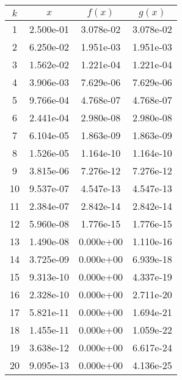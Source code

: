 \begin{tabular}{cccc}
\toprule
 $k$ &       $x$ &    $f(x)$ &    $g(x)$ \\
\midrule
   1 & 2.500e-01 & 3.078e-02 & 3.078e-02 \\
   2 & 6.250e-02 & 1.951e-03 & 1.951e-03 \\
   3 & 1.562e-02 & 1.221e-04 & 1.221e-04 \\
   4 & 3.906e-03 & 7.629e-06 & 7.629e-06 \\
   5 & 9.766e-04 & 4.768e-07 & 4.768e-07 \\
   6 & 2.441e-04 & 2.980e-08 & 2.980e-08 \\
   7 & 6.104e-05 & 1.863e-09 & 1.863e-09 \\
   8 & 1.526e-05 & 1.164e-10 & 1.164e-10 \\
   9 & 3.815e-06 & 7.276e-12 & 7.276e-12 \\
  10 & 9.537e-07 & 4.547e-13 & 4.547e-13 \\
  11 & 2.384e-07 & 2.842e-14 & 2.842e-14 \\
  12 & 5.960e-08 & 1.776e-15 & 1.776e-15 \\
  13 & 1.490e-08 & 0.000e+00 & 1.110e-16 \\
  14 & 3.725e-09 & 0.000e+00 & 6.939e-18 \\
  15 & 9.313e-10 & 0.000e+00 & 4.337e-19 \\
  16 & 2.328e-10 & 0.000e+00 & 2.711e-20 \\
  17 & 5.821e-11 & 0.000e+00 & 1.694e-21 \\
  18 & 1.455e-11 & 0.000e+00 & 1.059e-22 \\
  19 & 3.638e-12 & 0.000e+00 & 6.617e-24 \\
  20 & 9.095e-13 & 0.000e+00 & 4.136e-25 \\
\bottomrule
\end{tabular}
